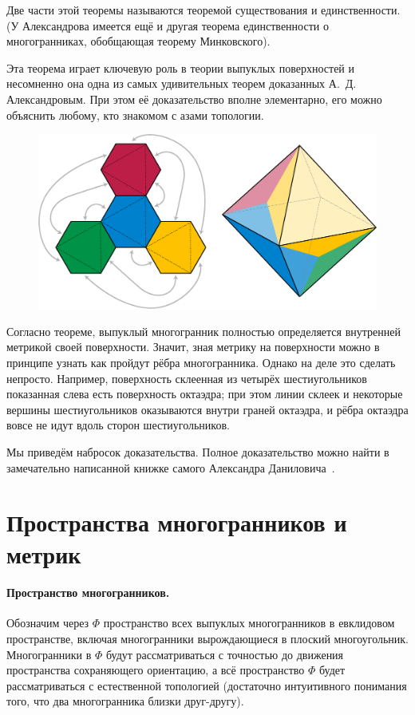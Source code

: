 \documentclass[oneside,a4paper]{article}
\begin{document}
Две части этой теоремы называются теоремой существования и единственности.
(У Александрова имеется ещё и другая теорема единственности о многогранниках, обобщающая теорему Минковского).

Эта теорема играет ключевую роль в теории выпуклых поверхностей 
и несомненно она одна из самых удивительных теорем доказанных А.~Д. Александровым.
При этом её доказательство вполне элементарно, его можно объяснить любому, кто знакомом с азами топологии.

\begin{figure}
\vskip-0mm
\centering
\includegraphics[width=\textwidth/2]{pics/4-hex_octahedron}
\vskip-0mm
\end{figure}

Согласно теореме, выпуклый многогранник полностью определяется внутренней метрикой своей поверхности.
Значит, зная метрику на поверхности можно в принципе узнать как пройдут рёбра многогранника.
Однако на деле это сделать непросто.
Например, поверхность склеенная из четырёх шестиугольников показанная слева есть поверхность октаэдра;
при этом линии склеек и некоторые вершины шестиугольников оказываются внутри граней октаэдра, и рёбра октаэдра вовсе не идут вдоль сторон шестиугольников.

Мы приведём набросок доказательства. 
Полное доказательство можно найти в замечательно написанной книжке самого Александра Даниловича~\cite{alexandrov}.


\section{Пространства многогранников и метрик}

\paragraph{Пространство многогранников.}
Обозначим через $\Phi$ пространство всех выпуклых многогранников в евклидовом пространстве, включая многогранники вырождающиеся в плоский многоугольник.
Многогранники в $\Phi$ будут рассматриваться с точностью до движения пространства сохраняющего ориентацию, а всё пространство $\Phi$ будет рассматриваться с естественной топологией (достаточно интуитивного понимания того, что два многогранника близки друг-другу).
\end{document}
